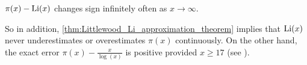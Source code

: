       \begin{proposition}\label{thm:Littlewood_Li_approximation_theorem}
        $\pi(x)-\operatorname{\mathrm{Li}}(x)$ changes sign infinitely often as $x \to \infty$.
      \end{proposition}

      So in addition, \cref{thm:Littlewood_Li_approximation_theorem} implies that $\operatorname{\mathrm{Li}}(x)$ never underestimates or overestimates $\pi(x)$ continuously. On the other hand, the exact error $\pi(x)-\frac{x}{\log(x)}$ is positive provided $x \ge 17$ (see \cite{rosser1962approximate}).